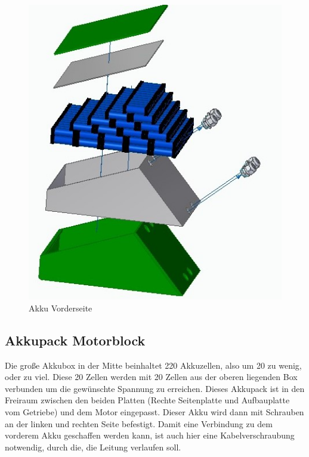 \begin{figure} [H]
	\begin{center}
		\includegraphics[scale=0.5]{figures/mechanik/Akku_Unterseite_Explosion.jpg}
			\caption{Akku Vorderseite}
			\label{fig:Akku Vorderseite}
	\end{center}
\end{figure}

\newpage

\subsection{Akkupack Motorblock}
Die große Akkubox in der Mitte beinhaltet 220 Akkuzellen, also um 20 zu wenig, oder zu viel. Diese 20 Zellen werden mit 20 Zellen aus der oberen liegenden Box verbunden um die gewünschte Spannung zu erreichen. Dieses Akkupack ist in den Freiraum zwischen den beiden Platten (Rechte Seitenplatte und Aufbauplatte vom Getriebe) und dem Motor eingepasst. Dieser Akku wird dann mit Schrauben an der linken und rechten Seite befestigt. Damit eine Verbindung zu dem vorderem Akku geschaffen werden kann, ist auch hier eine Kabelverschraubung notwendig, durch die, die Leitung verlaufen soll. 


